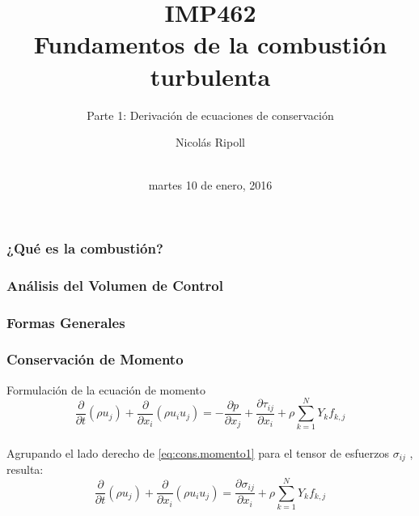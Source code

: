 \documentclass[11pt]{beamer}
\author{Nicolás Ripoll} %
\title{IMP462 \\ Fundamentos de la combustión turbulenta}
\subtitle{Parte 1: Derivación de ecuaciones de conservación}
\institute{Departamento de Ingeniería Mecánica \\Universidad Técnica Federico Santa María}
\date{\\ martes 10 de enero, 2016}
\begin{document}
	\maketitle
	
	\begin{frame}
		\frametitle{¿Qué es la combustión?}
	\end{frame}

	\begin{frame}
		\frametitle{Análisis del Volumen de Control}
	\end{frame}
	
	\begin{frame}
		\frametitle{Formas Generales}
	\end{frame}
	
	\begin{frame}
		\frametitle{Conservación de Momento}
	
		Formulación de la ecuación de momento 
		\begin{equation} %
			\dfrac{\partial}{\partial t} \left(\rho u_{j}\right) + \dfrac{\partial}{\partial x_{i}} \left(\rho u_{i} u_{j}\right) = -\dfrac{\partial p}{\partial x_{j}} + \dfrac{\partial \tau_{i j}}{\partial x_{i}} + \rho \sum_{k=1}^{N} Y_{k} f_{k,j}
			\label{eq:cons.momento1}
		\end{equation}
		\\
		Agrupando el lado derecho de \eqref{eq:cons.momento1} para el tensor de esfuerzos $\sigma_{i j}$ , resulta:
		\\
		\begin{equation} %
			\dfrac{\partial}{\partial t} \left(\rho u_{j}\right) + \dfrac{\partial}{\partial x_{i}} \left(\rho u_{i} u_{j}\right) = \dfrac{\partial \sigma_{i j}}{\partial x_{i}} + \rho \sum_{k=1}^{N} Y_{k} f_{k,j}
			\label{eq:cons.momento2}
		\end{equation}
		
	\end{frame}
	


\end{document}
